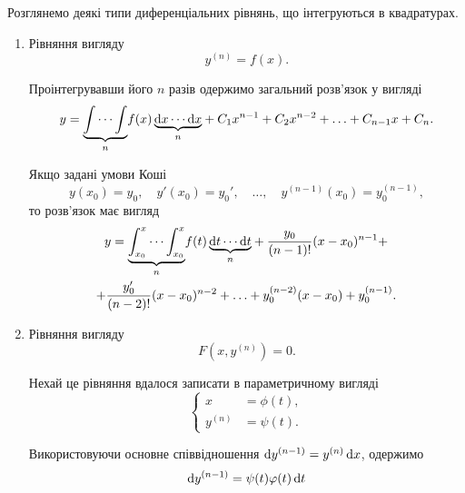 Розглянемо деякі типи диференціальних рівнянь, що інтегруються в квадратурах.

\begin{enumerate}
    \item Рівняння вигляду
    \begin{equation*}
    	y^{(n)} = f(x).
    \end{equation*}
    
    Проінтегрувавши його $n$ разів одержимо загальний розв'язок у вигляді
    \begin{equation*}
    	y = \underset{n}{\underbrace{\int \cdots \int}} f(x) \,\underset{n}{\underbrace{\mathop{}\!\mathrm{d} x \cdots \mathop{}\!\mathrm{d} x}} + C_1 x^{n-1} + C_2 x^{n-2} + \ldots + C_{n-1} x + C_n.
    \end{equation*}
    
    Якщо задані умови Коші
    \begin{equation*}
    	y(x_0) = y_0, \quad y'(x_0) = y_0', \quad \ldots, \quad y^{(n - 1)} (x_0) = y_0^{(n-1)},
    \end{equation*}
    то розв'язок має вигляд
    \begin{multline*}
    	y = \underset{n}{\underbrace{\int_{x_0}^x \cdots \int_{x_0}^x}} f(t) \, \underset{n}{\underbrace{\mathop{}\!\mathrm{d} t \cdots \mathop{}\!\mathrm{d} t}} + \frac{y_0}{(n-1)!}  (x-x_0)^{n-1} + \\ 
    	+ \frac{y_0'}{(n-2)!}  (x-x_0)^{n-2} + \ldots + y_0^{(n-2)}  (x-x_0) + y_0^{(n-1)}.
    \end{multline*}
    
    \item Рівняння вигляду
    \begin{equation*}
    	F\left(x, y^{(n)}\right) = 0.
    \end{equation*}
    
    Нехай це рівняння вдалося записати в параметричному вигляді
    \begin{equation*}
    	\left\{
    		\begin{aligned}
    			x &= \phi(t), \\
    			y^{(n)} &= \psi (t).
    		\end{aligned}
    	\right.
    \end{equation*}
    
    Використовуючи основне співвідношення $\mathop{}\!\mathrm{d} y^{(n-1)} = y^{(n)}  \mathop{}\!\mathrm{d} x$, одержимо
    \begin{equation*}
    	\mathop{}\!\mathrm{d} y^{(n-1)} = \psi(t)  \varphi(t)  \mathop{}\!\mathrm{d} t
    \end{equation*}
    

\end{enumerate}
